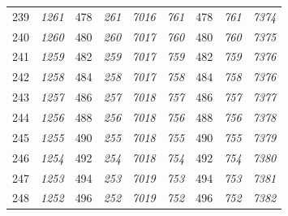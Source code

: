 \documentclass[10pt,fleqn]{article}
\begin{document}
\begin{longtable}{c|cccccccc}
239 & {\color{blue} \it 1261 \rm} & {\color{black} 478} & {\color{blue} \it 261 \rm} & {\color{blue} \it 7016 \rm} & {\color{blue} \it 761 \rm} & {\color{black} 478} & {\color{blue} \it 761 \rm} & {\color{blue} \it 7374 \rm} \\
240 & {\color{blue} \it 1260 \rm} & {\color{black} 480} & {\color{blue} \it 260 \rm} & {\color{blue} \it 7017 \rm} & {\color{blue} \it 760 \rm} & {\color{black} 480} & {\color{blue} \it 760 \rm} & {\color{blue} \it 7375 \rm} \\
241 & {\color{blue} \it 1259 \rm} & {\color{black} 482} & {\color{blue} \it 259 \rm} & {\color{blue} \it 7017 \rm} & {\color{blue} \it 759 \rm} & {\color{black} 482} & {\color{blue} \it 759 \rm} & {\color{blue} \it 7376 \rm} \\
242 & {\color{blue} \it 1258 \rm} & {\color{black} 484} & {\color{blue} \it 258 \rm} & {\color{blue} \it 7017 \rm} & {\color{blue} \it 758 \rm} & {\color{black} 484} & {\color{blue} \it 758 \rm} & {\color{blue} \it 7376 \rm} \\
243 & {\color{blue} \it 1257 \rm} & {\color{black} 486} & {\color{blue} \it 257 \rm} & {\color{blue} \it 7018 \rm} & {\color{blue} \it 757 \rm} & {\color{black} 486} & {\color{blue} \it 757 \rm} & {\color{blue} \it 7377 \rm} \\
244 & {\color{blue} \it 1256 \rm} & {\color{black} 488} & {\color{blue} \it 256 \rm} & {\color{blue} \it 7018 \rm} & {\color{blue} \it 756 \rm} & {\color{black} 488} & {\color{blue} \it 756 \rm} & {\color{blue} \it 7378 \rm} \\
245 & {\color{blue} \it 1255 \rm} & {\color{black} 490} & {\color{blue} \it 255 \rm} & {\color{blue} \it 7018 \rm} & {\color{blue} \it 755 \rm} & {\color{black} 490} & {\color{blue} \it 755 \rm} & {\color{blue} \it 7379 \rm} \\
246 & {\color{blue} \it 1254 \rm} & {\color{black} 492} & {\color{blue} \it 254 \rm} & {\color{blue} \it 7018 \rm} & {\color{blue} \it 754 \rm} & {\color{black} 492} & {\color{blue} \it 754 \rm} & {\color{blue} \it 7380 \rm} \\
247 & {\color{blue} \it 1253 \rm} & {\color{black} 494} & {\color{blue} \it 253 \rm} & {\color{blue} \it 7019 \rm} & {\color{blue} \it 753 \rm} & {\color{black} 494} & {\color{blue} \it 753 \rm} & {\color{blue} \it 7381 \rm} \\
248 & {\color{blue} \it 1252 \rm} & {\color{black} 496} & {\color{blue} \it 252 \rm} & {\color{blue} \it 7019 \rm} & {\color{blue} \it 752 \rm} & {\color{black} 496} & {\color{blue} \it 752 \rm} & {\color{blue} \it 7382 \rm} \\

\end{longtable}
\end{document}
